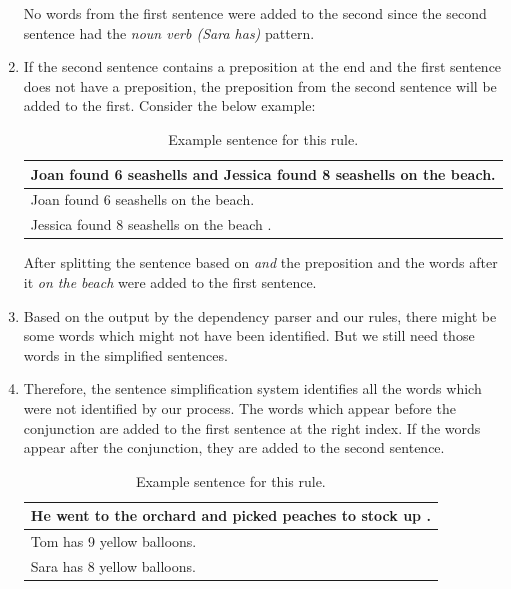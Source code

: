 \documentclass[11pt]{article}
\begin{document}
\begin{enumerate}
No words from the first sentence were added to the second since the second sentence had the \textit{noun verb (Sara has)} pattern.

\item
If the second sentence contains a preposition at the end and the first sentence does not have a preposition, the preposition from the second sentence will be added to the first. Consider the below example:

\begin{table}[h!]
\centering
\begin{tabular}{ | m{25em} | }
\hline
 \textbf{Joan found 6 seashells and Jessica found 8 seashells on the beach.}\\
\hline
Joan found 6 seashells on the beach.\\
\hline
Jessica found 8 seashells on the beach .\\
\hline
\end{tabular}
\caption{Example sentence for this rule.}
\label{table:12}
\end{table}

After splitting the sentence based on \textit{and} the preposition and the words after it \textit{on the beach} were added to the first sentence.

\item
Based on the output by the dependency parser and our rules, there might be some words which might not have been identified. But we still need those words in the simplified sentences.

\item
Therefore, the sentence simplification system identifies all the words which were not identified by our process. The words which appear before the conjunction are added to the first sentence at the right index. If the words appear after the conjunction, they are added to the second sentence.

\begin{table}[h!]
\centering
\begin{tabular}{ | m{25em} | }
\hline
 \textbf{He went to the orchard and picked peaches to stock up .}\\
\hline
Tom has 9 yellow balloons.\\
\hline
Sara has 8 yellow balloons.\\
\hline
\end{tabular}
\caption{Example sentence for this rule.}
\label{table:13}
\end{table}

\end{enumerate}
\end{document}
